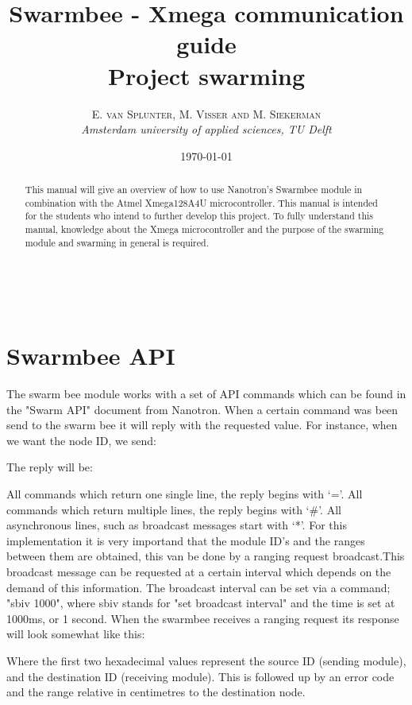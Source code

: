\documentclass[a4paper, 10pt]{article} %
\title{\textbf{Swarmbee - Xmega communication guide}\\ %
Project swarming} %
\author{\textsc{E. van Splunter, M. Visser  and M.
Siekerman} %
\\{\textit{Amsterdam university of applied sciences, TU Delft}}} %
\date{\today} %
\makeatletter
\renewcommand{\maketitle}{ %
\begin{flushright} %
{\LARGE\@title} %

\vspace{50pt} %

{\large\@author} %
\\\@date %

\vspace{40pt} %
\end{flushright}
}
\makeatother
\begin{document}
\maketitle %



\begin{abstract}
This manual will give an overview of how to use Nanotron's Swarmbee module in combination with the Atmel Xmega128A4U microcontroller. This manual is intended for the students who intend to further develop this project. To fully understand this manual, knowledge about the Xmega microcontroller and the purpose of the swarming module and swarming in general is required.
\end{abstract}

\vspace{30pt} %


\section*{Swarmbee API}
The swarm bee module works with a set of API commands which can be found in the "Swarm API" document from Nanotron. When a certain command was been send to the swarm bee it will reply with the requested value. For instance, when we want the node ID, we send: 

 The reply will be: 

All commands which return one single line, the reply begins with ‘=’. All commands which return multiple lines, the reply begins with ‘\#’. All asynchronous lines, such as broadcast messages start with ‘*’. For this implementation it is very importand that the module ID's and the ranges between them are obtained, this van be done by a ranging request broadcast.This broadcast message can be requested at a certain interval which depends on the demand of this information. The broadcast interval can be set via a command;
"sbiv 1000", where sbiv stands for "set broadcast interval" and the time is set
at 1000ms, or 1 second. When the swarmbee receives a ranging request its
response will look somewhat like this: 

Where the first two hexadecimal values represent the source ID (sending
module), and the destination ID (receiving module). This is followed up by an
error code and the range relative in centimetres to the destination node.
\end{document}
